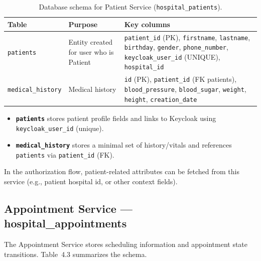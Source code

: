 \begin{table}[H]
\centering
\renewcommand{\arraystretch}{1.2}
\begin{tabular}{|p{3.2cm}|p{5.6cm}|p{5.6cm}|}
\hline
\textbf{Table} & \textbf{Purpose} & \textbf{Key columns} \\
\hline
\texttt{patients} &
Entity created for user who is Patient &
\texttt{patient\_id} (PK), \texttt{firstname}, \texttt{lastname}, \texttt{birthday}, \texttt{gender}, \texttt{phone\_number}, \texttt{keycloak\_user\_id} (UNIQUE), \texttt{hospital\_id} \\
\hline
\texttt{medical\_history} &
Medical history &
\texttt{id} (PK), \texttt{patient\_id} (FK \textrightarrow{} patients), \texttt{blood\_pressure}, \texttt{blood\_sugar}, \texttt{weight}, \texttt{height}, \texttt{creation\_date} \\
\hline
\end{tabular}
\caption{Database schema for Patient Service (\texttt{hospital\_patients}).}
\label{tab:db-schema-patient-service}
\end{table}
\begin{itemize}
  \item \textbf{\texttt{patients}} stores patient profile fields and links to Keycloak using \texttt{keycloak\_user\_id} (unique).
  \item \textbf{\texttt{medical\_history}} stores a minimal set of history/vitals and references \texttt{patients} via \texttt{patient\_id} (FK).
\end{itemize}

In the authorization flow, patient-related attributes can be fetched from this service (e.g., patient hospital id, or other context fields).


\subsection{Appointment Service — hospital\_appointments}
The Appointment Service stores scheduling information and appointment state transitions. Table~4.3 summarizes the schema.

